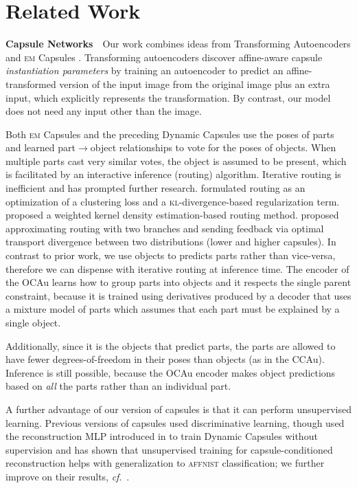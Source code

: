\section{Related Work}
\label{sec:related_work}

\textbf{Capsule Networks}\ \ 
Our work combines ideas from Transforming Autoencoders \citep{Hinton2011tae} and \textsc{em} Capsules \citep{Hinton2018capsule}.
Transforming autoencoders discover affine-aware capsule \textit{instantiation parameters} by training an autoencoder to predict an affine-transformed version of the input image from the original image plus an extra input, which explicitly represents the transformation.
By contrast, our model does not need any input other than the image.

Both \textsc{em} Capsules and the preceding Dynamic Capsules \citep{Sabour2017capsule} use the poses of parts and learned part$\rightarrow$object relationships to vote for the poses of objects. When multiple parts cast very similar votes, the object is assumed to be present, which is facilitated by an interactive inference (routing) algorithm. Iterative routing is inefficient and has prompted further research. \cite{Wang2018optimization} formulated routing as an optimization of a clustering loss and a \textsc{kl}-divergence-based regularization term.  \cite{Zhang2018fast} proposed a weighted kernel density estimation-based routing method. \cite{Li2018encapsule} proposed approximating routing with two branches and sending feedback via optimal transport divergence between two distributions (lower and higher capsules). 
In contrast to prior work, we use objects to predicts parts rather than vice-versa, therefore we can dispense with iterative routing at inference time. The encoder of the \gls{OCAu} learns how to group parts into objects and it respects the single parent constraint, because it is trained using derivatives produced by a decoder that uses a mixture model of parts which assumes that each part must be explained by a single object. 

Additionally, since it is the objects that predict parts, the parts are allowed to have fewer degrees-of-freedom in their poses than objects (as in the \gls{CCAu}). 
Inference is still possible, because the \gls{OCAu} encoder makes object predictions based on {\it all} the parts rather than an individual part.

A further advantage of our version of capsules is that it can perform unsupervised learning. Previous versions of capsules used discriminative learning, though \cite{Rawlinson2018sparsecaps} used the reconstruction \gls{MLP} introduced in \cite{Sabour2017capsule} to train Dynamic Capsules without supervision and has shown that unsupervised training for capsule-conditioned reconstruction helps with generalization to \textsc{affnist} classification; we further improve on their results, \textit{cf}.\ .

